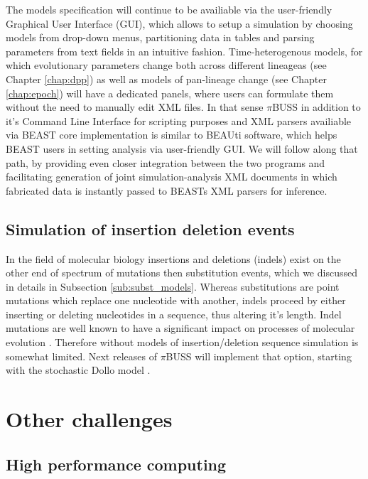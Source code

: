 The models specification will continue to be availiable via the user-friendly Graphical User Interface (GUI), which allows to setup a simulation by choosing models from drop-down menus, partitioning data in tables and parsing parameters from text fields in an intuitive fashion.
Time-heterogenous models, for which evolutionary parameters change both across different lineageas (see Chapter \ref{chap:dpp}) as well as models of pan-lineage change (see Chapter \ref{chap:epoch}) will have a dedicated panels, where users can formulate them without the need to manually edit XML files.
In that sense $\pi$BUSS in addition to it's Command Line Interface for scripting purposes and XML parsers availiable via BEAST core implementation is similar to BEAUti software, which helps BEAST users in setting analysis via user-friendly GUI.
We will follow along that path, by providing even closer integration between the two programs and facilitating generation of joint simulation-analysis XML documents in which fabricated data is instantly passed to BEASTs XML parsers for inference.

\subsection{Simulation of insertion deletion events}

In the field of molecular biology insertions and deletions (indels) exist on the other end of spectrum of mutations then substitution events, which we discussed in details in Subsection \ref{sub:subst_models}.
Whereas substitutions are point mutations which replace one nucleotide with another, indels proceed by either inserting or deleting nucleotides in a sequence, thus altering it's length. 
Indel mutations are well known to have a significant impact on processes of molecular evolution \citep{Fletcher2009}.
Therefore without models of insertion/deletion sequence simulation is somewhat limited.
Next releases of $\pi$BUSS will implement that option, starting with the stochastic Dollo model \citep{LeQuesne1974}.

\section{Other challenges}

\subsection{High performance computing}


